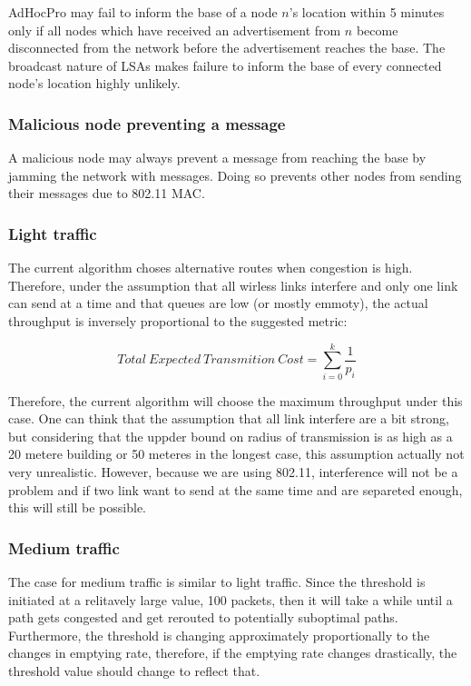 \documentclass[letterpaper]{article}
\begin{document}
AdHocPro may fail to inform the base of a node $n$'s location within 5 minutes only if all nodes which have received an
advertisement from $n$ become disconnected from the network before the advertisement reaches the base. The broadcast
nature of LSAs makes failure to inform the base of every connected node's location highly unlikely.

\subsubsection{Malicious node preventing a message}

A malicious node may always prevent a message from reaching the base by jamming the network with messages. Doing so prevents
other nodes from sending their messages due to 802.11 MAC.

\subsubsection{Light traffic}

The current algorithm choses alternative routes when congestion is high. Therefore, under the assumption that all wirless links interfere and only one link can send at a time and that queues are low (or mostly emmoty), the actual throughput is inversely proportional to the suggested metric:

$$  Total \ Expected \ Transmition \ Cost = \sum_{i=0}^{k}\frac{1}{p_{i}}$$

Therefore, the current algorithm will choose the maximum throughput under this case. One can think that the assumption that all link interfere are a bit strong, but considering that the uppder bound on radius of transmission is as high as a 20 metere building or 50 meteres in the longest case, this assumption actually not very unrealistic. However, because we are using 802.11, interference will not be a problem and if two link want to send at the same time and are separeted enough, this will still be possible.

\subsubsection{Medium traffic}

The case for medium traffic is similar to light traffic. Since the threshold is initiated at a relitavely large value, 100 packets, then it will take a while until a path gets congested and get rerouted to potentially suboptimal paths. Furthermore, the threshold is changing approximately proportionally to the changes in emptying rate, therefore, if the emptying rate changes drastically, the threshold value should change to reflect that.
\end{document}
